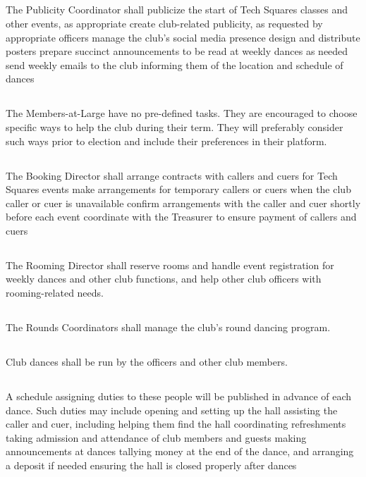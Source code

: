 \documentclass{bylaws}
\begin{document}
\subsection{}The Publicity Coordinator shall
\duty publicize the start of Tech Squares classes and other events, as appropriate
\duty create club-related publicity, as requested by appropriate officers
\duty manage the club's social media presence
\duty design and distribute posters
\duty prepare succinct announcements to be read at weekly dances as needed
\duty send weekly emails to the club informing them of the location and schedule of dances

\subsection{}The Members-at-Large have no pre-defined tasks. They are encouraged to choose specific ways to help the club during their term. They will preferably consider such ways prior to election and include their preferences in their platform.

\subsection{}The Booking Director shall
\duty arrange contracts with callers and cuers for Tech Squares events
\duty make arrangements for temporary callers or cuers when the club caller or cuer is unavailable
\duty confirm arrangements with the caller and cuer shortly before each event
\duty coordinate with the Treasurer to ensure payment of callers and cuers
\subsection{}The Rooming Director shall reserve rooms and handle event registration for weekly dances and other club functions, and help other club officers with rooming-related needs.
\subsection{}The Rounds Coordinators shall manage the club's round dancing program.

\subsection{}Club dances shall be run by the officers and other club members.

\subsection{}A schedule assigning duties to these people will be published in advance of each dance. Such duties may include
\duty opening and setting up the hall
\duty assisting the caller and cuer, including helping them find the hall
\duty coordinating refreshments
\duty taking admission and attendance of club members and guests
\duty making announcements at dances
\duty tallying money at the end of the dance, and arranging a deposit if needed
\duty ensuring the hall is closed properly after dances
\end{document}
